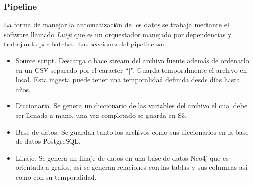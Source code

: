 \subsubsection{Pipeline}
La forma de manejar la automatización de los datos se trabaja mediante el software llamado \textit{Luigi} que es un orquestador manejado por dependencias y trabajando por batches. Las secciones del pipeline son:
\begin{itemize}
    \item Source script. Descarga o hace stream del archivo fuente además de ordenarlo en un CSV separado por el caracter ``|''. Guarda temporalmente el archivo en local. Esta ingesta puede tener una temporalidad definida desde días hasta años.
    \item Diccionario. Se genera un diccionario de las variables del archivo el cual debe ser llenado a mano, una vez completado se guarda en S3.
    \item Base de datos. Se guardan tanto los archivos como sus diccionarios en la base de datos PostgreSQL.
    \item Linaje. Se genera un linaje de datos en una base de datos Neo4j que es orientada a grafos, así se generan relaciones con las tablas y sus columnas así como con su temporalidad.
\end{itemize}
